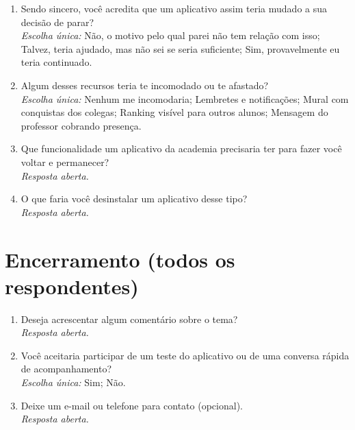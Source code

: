 \begin{enumerate}[leftmargin=*, itemsep=1pt, parsep=0pt]
\begin{enumerate}[label=\alph*)]
    \item Histórico completo de presença e evolução pessoal
    \item Mural ou feed da turma, com conquistas dos colegas
    \item Mensagem automática do professor após alguns dias de ausência
    \item Lembretes automáticos nos dias de treino
  \end{enumerate}
  \item Sendo sincero, você acredita que um aplicativo assim teria mudado a sua decisão de parar?\\
        {\footnotesize\textit{Escolha única:} Não, o motivo pelo qual parei não tem relação com isso; Talvez, teria ajudado, mas não sei se seria suficiente; Sim, provavelmente eu teria continuado.}
  \item Algum desses recursos teria te incomodado ou te afastado?\\
        {\footnotesize\textit{Escolha única:} Nenhum me incomodaria; Lembretes e notificações; Mural com conquistas dos colegas; Ranking visível para outros alunos; Mensagem do professor cobrando presença.}
  \item Que funcionalidade um aplicativo da academia precisaria ter para fazer você voltar e permanecer?\\
        {\footnotesize\textit{Resposta aberta.}}
  \item O que faria você desinstalar um aplicativo desse tipo?\\
        {\footnotesize\textit{Resposta aberta.}}
\end{enumerate}

\section*{Encerramento (todos os respondentes)}
\begin{enumerate}[leftmargin=*, itemsep=1pt, parsep=0pt]
  \item Deseja acrescentar algum comentário sobre o tema?\\
        {\footnotesize\textit{Resposta aberta.}}
  \item Você aceitaria participar de um teste do aplicativo ou de uma conversa rápida de acompanhamento?\\
        {\footnotesize\textit{Escolha única:} Sim; Não.}
  \item Deixe um e-mail ou telefone para contato (opcional).\\
        {\footnotesize\textit{Resposta aberta.}}
\end{enumerate}

